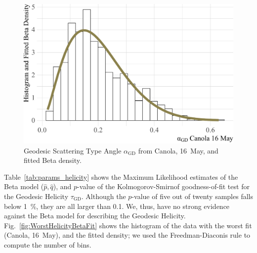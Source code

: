 \documentclass[journal]{IEEEtran}
\begin{document}
\begin{figure}[hbt]
\centering
\includegraphics[width=\linewidth]{CanolaAlphaBetaFit}
\caption{Geodesic Scattering Type Angle $\alpha_{\text{GD}}$ from Canola, 16~May, and fitted Beta density.}\label{fig:WorstAlphaBetaFit}
\end{figure}

Table~\ref{tab:params_helicity} shows the Maximum Likelihood estimates of the Beta model ($\widehat p,\widehat q$), and $p$-value of the Kolmogorov-Smirnof goodness-of-fit test for the Geodesic Helicity $\tau_{\text{GD}}$.
Although the $p$-value of five out of twenty samples falls below \SI{1}{\percent}, they are all larger than \SI{0.1}{\permille}.
We, thus, have no strong evidence against the Beta model for describing the Geodesic Helicity.
Fig.~\ref{fig:WorstHelicityBetaFit} shows the histogram of the data with the worst fit (Canola, 16~May), and the fitted density; we used the Freedman-Diaconis rule to compute the number of bins.
\end{document}
